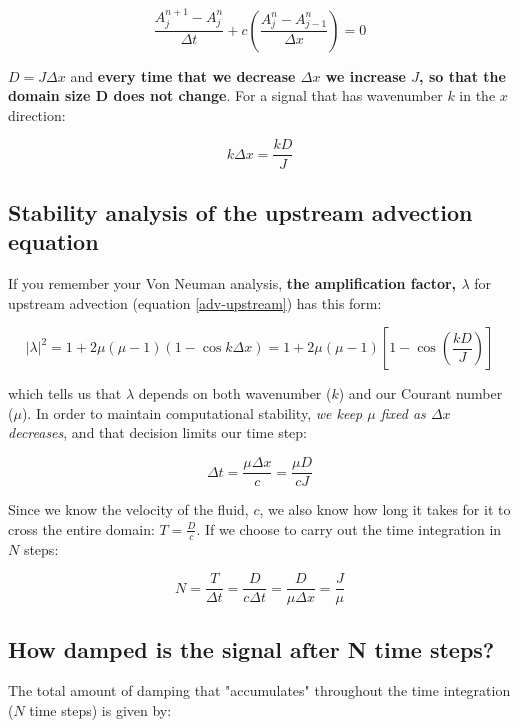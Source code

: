 \begin{equation}
	\frac {A_j^{n+1}-A_j^{n}}{\Delta t} +c \left(  \frac {A_j^{n}-A_{j-1}^{n}}{\Delta x}  \right) = 0
	\label{adv-upstream}
\end{equation}

$D=J \Delta x$ and {\bf every time that we decrease $\Delta x$ we increase $J$, so that the domain size D does not change}. For a signal that has wavenumber $k$ in the $x$ direction:

\begin{equation}
	k \Delta x = \frac {k D}{J}
\end{equation}


\subsection{Stability analysis of the upstream advection equation}


If you remember your Von Neuman analysis, \textbf{the amplification factor, $\lambda$} for upstream advection (equation \ref{adv-upstream})	has this form:

\begin{equation}
	|\lambda|^2 = 1+2\mu(\mu-1)(1-\cos k \Delta x) = 1+2\mu(\mu-1)[1-\cos ( \frac {k D} {J})]
\end{equation}

which tells us that $\lambda$ depends on both wavenumber ($k$) and our Courant number ($\mu$). 
In order to maintain computational stability, \emph{we keep $\mu$ fixed as $\Delta x$ decreases}, and that decision limits our time step:

\begin{equation}
	\Delta t = \frac {\mu \Delta x}{c} = \frac {\mu D}{cJ}
\end{equation}

Since we know the velocity of the fluid, $c$, we also know how long it takes for it to cross the entire domain: $T=\frac {D}{c}$. If we choose to carry out the time integration in $N$ steps:

\begin{equation}
	N= \frac {T}{\Delta t} = \frac {D}{c \Delta t} = \frac {D}{\mu \Delta x} = \frac {J}{\mu}
\end{equation}



\subsection{How damped is the signal after N time steps?}
The total amount of damping that "accumulates" throughout the time integration ($N$ time steps) is given by:

